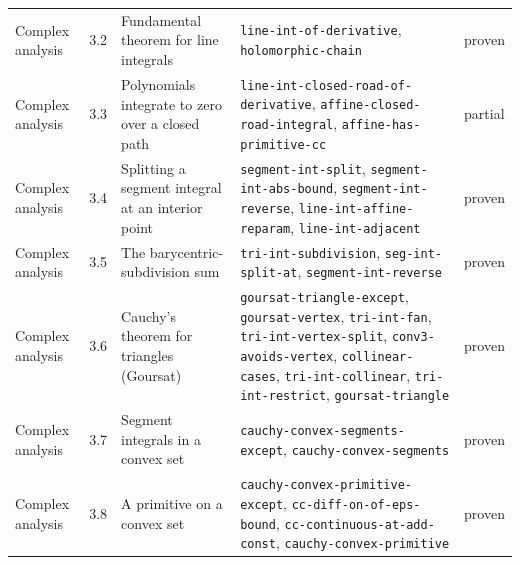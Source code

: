 \begin{longtable}{@{}ll>{\raggedright\arraybackslash}p{4.2cm}>{\raggedright\arraybackslash}p{4.2cm}l@{}}
Complex analysis & 3.2 & Fundamental theorem for line integrals & \texttt{line-\allowbreak{}int-\allowbreak{}of-\allowbreak{}derivative}, \texttt{holomorphic-\allowbreak{}chain} & proven \\
Complex analysis & 3.3 & Polynomials integrate to zero over a closed path & \texttt{line-\allowbreak{}int-\allowbreak{}closed-\allowbreak{}road-\allowbreak{}of-\allowbreak{}derivative}, \texttt{affine-\allowbreak{}closed-\allowbreak{}road-\allowbreak{}integral}, \texttt{affine-\allowbreak{}has-\allowbreak{}primitive-\allowbreak{}cc} & partial \\
Complex analysis & 3.4 & Splitting a segment integral at an interior point & \texttt{segment-\allowbreak{}int-\allowbreak{}split}, \texttt{segment-\allowbreak{}int-\allowbreak{}abs-\allowbreak{}bound}, \texttt{segment-\allowbreak{}int-\allowbreak{}reverse}, \texttt{line-\allowbreak{}int-\allowbreak{}affine-\allowbreak{}reparam}, \texttt{line-\allowbreak{}int-\allowbreak{}adjacent} & proven \\
Complex analysis & 3.5 & The barycentric-subdivision sum & \texttt{tri-\allowbreak{}int-\allowbreak{}subdivision}, \texttt{seg-\allowbreak{}int-\allowbreak{}split-\allowbreak{}at}, \texttt{segment-\allowbreak{}int-\allowbreak{}reverse} & proven \\
Complex analysis & 3.6 & Cauchy's theorem for triangles (Goursat) & \texttt{goursat-\allowbreak{}triangle-\allowbreak{}except}, \texttt{goursat-\allowbreak{}vertex}, \texttt{tri-\allowbreak{}int-\allowbreak{}fan}, \texttt{tri-\allowbreak{}int-\allowbreak{}vertex-\allowbreak{}split}, \texttt{conv3-\allowbreak{}avoids-\allowbreak{}vertex}, \texttt{collinear-\allowbreak{}cases}, \texttt{tri-\allowbreak{}int-\allowbreak{}collinear}, \texttt{tri-\allowbreak{}int-\allowbreak{}restrict}, \texttt{goursat-\allowbreak{}triangle} & proven \\
Complex analysis & 3.7 & Segment integrals in a convex set & \texttt{cauchy-\allowbreak{}convex-\allowbreak{}segments-\allowbreak{}except}, \texttt{cauchy-\allowbreak{}convex-\allowbreak{}segments} & proven \\
Complex analysis & 3.8 & A primitive on a convex set & \texttt{cauchy-\allowbreak{}convex-\allowbreak{}primitive-\allowbreak{}except}, \texttt{cc-\allowbreak{}diff-\allowbreak{}on-\allowbreak{}of-\allowbreak{}eps-\allowbreak{}bound}, \texttt{cc-\allowbreak{}continuous-\allowbreak{}at-\allowbreak{}add-\allowbreak{}const}, \texttt{cauchy-\allowbreak{}convex-\allowbreak{}primitive} & proven \\

\end{longtable}
